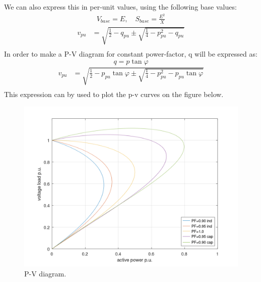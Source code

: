 \documentclass[]{book}
\begin{document}
We can also express this in per-unit values, using the following base values:
\[
\begin{aligned}
V_{base} =E, \quad S_{base} = \frac{E^2}{X}
\end{aligned}
\label{eq:PV3}
\]
\[
\begin{aligned}
v_{pu}  &= \sqrt{  \frac{1}{2}- q_{pu}  \pm \sqrt{ \frac{1}{4} -
  p_{pu}^2 - q_{pu}  } }   \\
\end{aligned}
\label{eq:PV4}
\]
In order to make a P-V diagram for constant power-factor, q will be expressed as:
\[
q = p  \tan \varphi 
\label{eq:PV5}
\]
\[
\begin{aligned}
v_{pu}  &= \sqrt{  \frac{1}{2}- p_{pu} \tan \varphi  \pm \sqrt{ \frac{1}{4} -
  p_{pu}^2 - p_{pu} \tan \varphi  } }   \\
\end{aligned}
\label{eq:PV6}
\]
This expression can by used to plot the p-v curves on the figure below.

\begin{figure}
\includegraphics[width=1\linewidth]{images/voltage-stability/PV-diagram} \caption{P-V diagram.}\label{fig:unnamed-chunk-2}
\end{figure}


\end{document}
